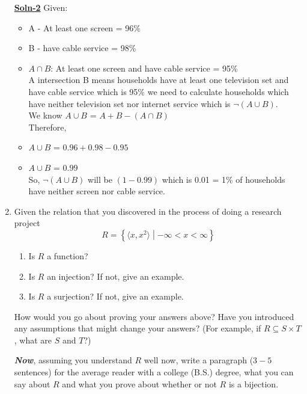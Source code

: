 \documentclass{article}
\begin{document}
\begin{enumerate}
        \textbf{\underline{Soln-2}} Given:
        \begin{itemize}
        \item {A - } At least one screen = 96\% 
        \item {B - } have cable service = 98\% 
        \item $A \cap B$: At least one screen and have cable service = 95\% 
        \\ A intersection B means households have at least one television set and have cable service which is 95\% we need to calculate 
        households which have neither television set nor internet service which is $\neg(A \cup B)$.
        \\ We know $A \cup B$ = $A + B - (A \cap B)$ 
        \\ Therefore, 
        \item $A \cup B$ = $0.96 + 0.98 - 0.95$ 
        \item $A \cup B$ = $0.99$ 
        \\ So, $\neg (A \cup B)$ will be $(1 - 0.99)$ which is 0.01 = 1\% of households have neither screen nor cable service.
        \end{itemize}

\item   Given the relation that you discovered in the process of doing
        a research project
        \[ R = \left\{ \langle x, x^2 \rangle \middle|
                -\infty < x < \infty \right\} \]
        \begin{enumerate}
        \item   Is $R$ a function?
        \item   Is $R$ an injection?  If not, give an example.
        \item   Is $R$ a surjection?  If not, give an example.
        \end{enumerate}
        How would you go about proving your answers above?  Have
        you introduced any assumptions that might change your answers?
        (For example, if $R \subseteq S \times T$, what are $S$ and $T$?)
        \par
        \emph{\textbf{Now}}, assuming you understand $R$ well now,
        write a paragraph
        ($3-5$ sentences) for the average reader with a college (B.S.)
        degree, what you can say about $R$ and what you prove about whether
        or not $R$ is a bijection.


\end{enumerate}
\end{document}
